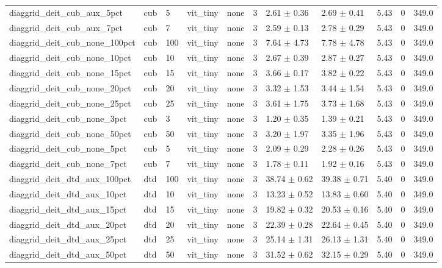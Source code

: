 \begin{tabular}{lllllllllll}
diaggrid_deit_cub_aux_5pct & cub & 5 & vit_tiny & none & 3 & 2.61 $\pm$ 0.36 & 2.69 $\pm$ 0.41 & 5.43 & 0 & 349.0 \\
diaggrid_deit_cub_aux_7pct & cub & 7 & vit_tiny & none & 3 & 2.59 $\pm$ 0.13 & 2.78 $\pm$ 0.29 & 5.43 & 0 & 349.0 \\
diaggrid_deit_cub_none_100pct & cub & 100 & vit_tiny & none & 3 & 7.64 $\pm$ 4.73 & 7.78 $\pm$ 4.78 & 5.43 & 0 & 349.0 \\
diaggrid_deit_cub_none_10pct & cub & 10 & vit_tiny & none & 3 & 2.67 $\pm$ 0.39 & 2.87 $\pm$ 0.27 & 5.43 & 0 & 349.0 \\
diaggrid_deit_cub_none_15pct & cub & 15 & vit_tiny & none & 3 & 3.66 $\pm$ 0.17 & 3.82 $\pm$ 0.22 & 5.43 & 0 & 349.0 \\
diaggrid_deit_cub_none_20pct & cub & 20 & vit_tiny & none & 3 & 3.32 $\pm$ 1.53 & 3.44 $\pm$ 1.54 & 5.43 & 0 & 349.0 \\
diaggrid_deit_cub_none_25pct & cub & 25 & vit_tiny & none & 3 & 3.61 $\pm$ 1.75 & 3.73 $\pm$ 1.68 & 5.43 & 0 & 349.0 \\
diaggrid_deit_cub_none_3pct & cub & 3 & vit_tiny & none & 3 & 1.20 $\pm$ 0.35 & 1.39 $\pm$ 0.21 & 5.43 & 0 & 349.0 \\
diaggrid_deit_cub_none_50pct & cub & 50 & vit_tiny & none & 3 & 3.20 $\pm$ 1.97 & 3.35 $\pm$ 1.96 & 5.43 & 0 & 349.0 \\
diaggrid_deit_cub_none_5pct & cub & 5 & vit_tiny & none & 3 & 2.09 $\pm$ 0.29 & 2.28 $\pm$ 0.26 & 5.43 & 0 & 349.0 \\
diaggrid_deit_cub_none_7pct & cub & 7 & vit_tiny & none & 3 & 1.78 $\pm$ 0.11 & 1.92 $\pm$ 0.16 & 5.43 & 0 & 349.0 \\
diaggrid_deit_dtd_aux_100pct & dtd & 100 & vit_tiny & none & 3 & 38.74 $\pm$ 0.62 & 39.38 $\pm$ 0.71 & 5.40 & 0 & 349.0 \\
diaggrid_deit_dtd_aux_10pct & dtd & 10 & vit_tiny & none & 3 & 13.23 $\pm$ 0.52 & 13.83 $\pm$ 0.60 & 5.40 & 0 & 349.0 \\
diaggrid_deit_dtd_aux_15pct & dtd & 15 & vit_tiny & none & 3 & 19.82 $\pm$ 0.32 & 20.53 $\pm$ 0.16 & 5.40 & 0 & 349.0 \\
diaggrid_deit_dtd_aux_20pct & dtd & 20 & vit_tiny & none & 3 & 22.39 $\pm$ 0.28 & 22.64 $\pm$ 0.45 & 5.40 & 0 & 349.0 \\
diaggrid_deit_dtd_aux_25pct & dtd & 25 & vit_tiny & none & 3 & 25.14 $\pm$ 1.31 & 26.13 $\pm$ 1.31 & 5.40 & 0 & 349.0 \\
diaggrid_deit_dtd_aux_50pct & dtd & 50 & vit_tiny & none & 3 & 31.52 $\pm$ 0.62 & 32.15 $\pm$ 0.29 & 5.40 & 0 & 349.0 \\

\end{tabular}
